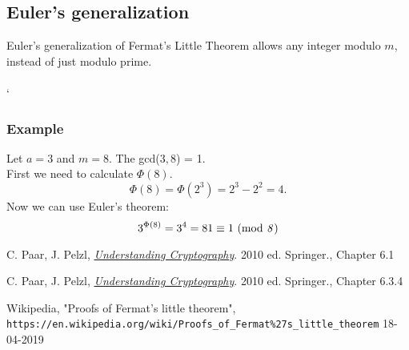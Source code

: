\documentclass{article}
\begin{document}
 	\subsection*{Euler's generalization \cite{fermatsummary}}
 	Euler's generalization of Fermat's Little Theorem allows any integer modulo $m$, instead of just modulo prime.
 	\\
 	\\`
 	
 	\subsubsection*{Example}
 	Let $a = 3$ and $m = 8$. The gcd($3, 8$) = 1. 
 	\\
 	First we need to calculate $\Phi(8)$.
 	$$
 	\Phi(8) = \Phi(2^3) = 2^3-2^2 = 4.
 	$$
 	Now we can use Euler's theorem:
 	$$
 	3^{\Phi(8)} = 3^4 = 81 \equiv 1 \text{ (mod \textit{8})}
 	$$

	\newpage

	\begin{thebibliography}{99}
		
		C. Paar, J. Pelzl, 
		\textit{\underline{Understanding Cryptography}}. 2010 ed.
		Springer., Chapter 6.1 
		
		C. Paar, J. Pelzl, 
		\textit{\underline{Understanding Cryptography}}. 2010 ed.
		Springer., Chapter 6.3.4 
		
		Wikipedia, "Proofs of Fermat's little theorem",
		\\\texttt{https://en.wikipedia.org/wiki/Proofs\_of\_Fermat\%27s\_little\_theorem} 18-04-2019
		
	\end{thebibliography}
\end{document}
